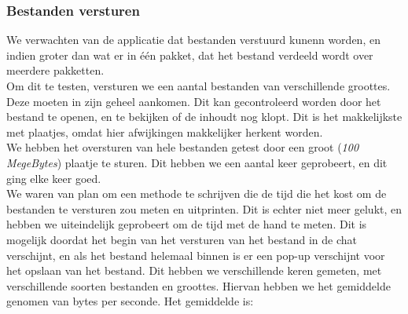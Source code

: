 \documentclass{article}
\begin{document}
\subsubsection{Bestanden versturen}
We verwachten van de applicatie dat bestanden verstuurd kunenn worden, en indien groter dan wat er in \'{e}\'{e}n pakket, dat het bestand verdeeld wordt over meerdere pakketten. \\
Om dit te testen, versturen we een aantal bestanden van verschillende groottes. Deze moeten in zijn geheel aankomen. Dit kan gecontroleerd worden door het bestand te openen, en te bekijken of de inhoudt nog klopt. Dit is het makkelijkste met plaatjes, omdat hier afwijkingen makkelijker herkent worden. \\
We hebben het oversturen van hele bestanden getest door een groot (\emph{100 MegeBytes}) plaatje te sturen. Dit hebben we een aantal keer geprobeert, en dit ging elke keer goed.\\
We waren van plan om een methode te schrijven die de tijd die het kost om de bestanden te versturen zou meten en uitprinten. Dit is echter niet meer gelukt, en hebben we uiteindelijk geprobeert om de tijd met de hand te meten. Dit is mogelijk doordat het begin van het versturen van het bestand in de chat verschijnt, en als het bestand helemaal binnen is er een pop-up verschijnt voor het opslaan van het bestand. Dit hebben we verschillende keren gemeten, met verschillende soorten bestanden en groottes. Hiervan hebben we het gemiddelde genomen van bytes per seconde. Het gemiddelde is: %
\end{document}

